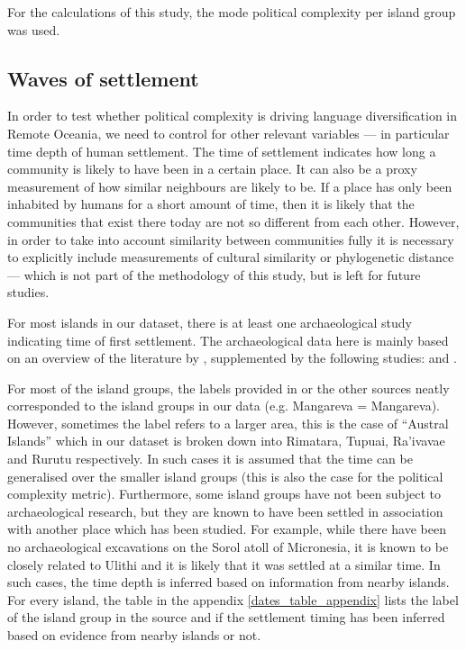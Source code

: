 \documentclass[unnumsec,webpdf,modern,medium]{oup-authoring-template}
\begin{document}
\begin{appendices}
For the calculations of this study, the mode political complexity per island group was used. 

\FloatBarrier
\subsection{Waves of settlement}
\label{appendix_def_dates}
In order to test whether political complexity is driving language diversification in Remote Oceania, we need to control for other relevant variables --- in particular time depth of human settlement. The time of settlement indicates how long a community is likely to have been in a certain place. It can also be a proxy measurement of how similar neighbours are likely to be. If a place has only been inhabited by humans for a short amount of time, then it is likely that the communities that exist there today are not so different from each other. However, in order to take into account similarity between communities fully it is necessary to explicitly include measurements of cultural similarity or phylogenetic distance --- which is not part of the methodology of this study, but is left for future studies.

For most islands in our dataset, there is at least one archaeological study indicating time of first settlement. The archaeological data here is mainly based on an overview of the literature by \citet{rieth_cochrane_2018}, supplemented by the following studies: \citet{intoh2007reconnaissance, intoh2008ongoing, carson2012recent, kirch2012basline, Napolitano_et_al_yap, ellis2012saipan} and \citet{levin_seikel_miles_2019}. 

For most of the island groups, the labels provided in \citet{rieth_cochrane_2018} or the other sources neatly corresponded to the island groups in our data (e.g. Mangareva = Mangareva). However, sometimes the label refers to a larger area, this is the case of ``Austral Islands'' which in our dataset is broken down into Rimatara, Tupuai, Ra'ivavae and Rurutu respectively. In such cases it is assumed that the time can be generalised over the smaller island groups (this is also the case for the political complexity metric). Furthermore, some island groups have not been subject to archaeological research, but they are known to have been settled in association with another place which has been studied. For example, while there have been no archaeological excavations on the Sorol atoll of Micronesia, it is known to be closely related to Ulithi \citep[23]{quackenbush1968sonsorol} and it is likely that it was settled at a similar time. In such cases, the time depth is inferred based on information from nearby islands. For every island, the table in the appendix \ref{dates_table_appendix} lists the label of the island group in the source and if the settlement timing has been inferred based on evidence from nearby islands or not.


\end{appendices}
\end{document}
